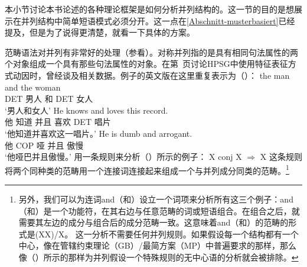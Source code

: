 \begin{exe}
\begin{xlist}[iv.]
\begin{exe}
\begin{xlist}[iv.]
本小节讨论本书论述的各种理论框架是如何分析并列结构的。这一节的目的是想展示在并列结构中简单短语模式必须分开。这一点在\ref{Abschnitt-musterbasiert}已经提及，但是为了说得更清楚，就看一下具体的方案。

范畴语法对并列有非常好的处理（参看\citealp{Steedman91a}）。对称并列指的是具有相同句法属性的两个对象组成一个具有那些句法属性的对象。在第~\pageref{Seite-HPSG-Koordination}页讨论HPSG中使用特征表征方式动因时，曾经谈及相关数据。例子的英文版在这里重复表示为（）：
\eal
\ex 
\gll the man and the woman\\
     DET 男人 和 DET 女人\\
\glt `男人和女人'
\ex 
\gll He knows and loves this record.\\
     他 知道 并且 喜欢 DET 唱片\\
\glt `他知道并喜欢这一唱片。'
\ex 
\gll He is dumb and arrogant.\\
     他 COP 哑 并且  傲慢\\
\glt `他哑巴并且傲慢。'
\zl
\citet{Steedman91a}用一条规则来分析（）所示的例子：
\ea
X conj X $\Rightarrow$ X
\z
这条规则将两个同种类的范畴用一个连接词连接起来组成一个与并列成分同类的范畴。\footnote{
另外，我们可以为连词and（和）设立一个词项来分析所有这三个例子：and（和）是一个功能符，在其右边与任意范畴的词或短语组合。在组合之后，就需要其左边的成分与组合后的成分范畴一致。这意味着and（和）的范畴的形式是(X\bs X)/X。
这一分析不需要任何并列规则。如果假设每一个结构都有一个中心，像在\indexgbc 管辖约束理论（GB）/最简方案（MP）\indexmpc 中普遍要求的那样，那么像（）所示的那样为并列假设一个特殊规则的无中心语的分析就会被排除。
}
\end{xlist}
\end{exe}
\end{xlist}
\end{exe}
